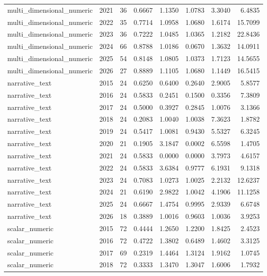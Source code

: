 \begin{tabular}{lrrrrrrr}
multi_dimensional_numeric & 2021 & 36 & 0.6667 & 1.1350 & 1.0783 & 3.3040 & 6.4835 \\
multi_dimensional_numeric & 2022 & 35 & 0.7714 & 1.0958 & 1.0680 & 1.6174 & 15.7099 \\
multi_dimensional_numeric & 2023 & 36 & 0.7222 & 1.0485 & 1.0365 & 1.2182 & 22.8436 \\
multi_dimensional_numeric & 2024 & 66 & 0.8788 & 1.0186 & 0.0670 & 1.3632 & 14.0911 \\
multi_dimensional_numeric & 2025 & 54 & 0.8148 & 1.0805 & 1.0373 & 1.7123 & 14.5655 \\
multi_dimensional_numeric & 2026 & 27 & 0.8889 & 1.1105 & 1.0680 & 1.1449 & 16.5415 \\
narrative_text & 2015 & 24 & 0.6250 & 0.6400 & 0.2640 & 2.9005 & 5.8577 \\
narrative_text & 2016 & 24 & 0.5833 & 0.2451 & 0.1500 & 0.3356 & 7.3809 \\
narrative_text & 2017 & 24 & 0.5000 & 0.3927 & 0.2845 & 1.0076 & 3.1366 \\
narrative_text & 2018 & 24 & 0.2083 & 1.0040 & 1.0038 & 7.3623 & 1.8782 \\
narrative_text & 2019 & 24 & 0.5417 & 1.0081 & 0.9430 & 5.5327 & 6.3245 \\
narrative_text & 2020 & 21 & 0.1905 & 3.1847 & 0.0002 & 6.5598 & 1.4705 \\
narrative_text & 2021 & 24 & 0.5833 & 0.0000 & 0.0000 & 3.7973 & 4.6157 \\
narrative_text & 2022 & 24 & 0.5833 & 3.6384 & 0.9777 & 6.1931 & 9.1318 \\
narrative_text & 2023 & 24 & 0.7083 & 1.0273 & 1.0025 & 2.2132 & 12.6237 \\
narrative_text & 2024 & 21 & 0.6190 & 2.9822 & 1.0042 & 4.1906 & 11.1258 \\
narrative_text & 2025 & 24 & 0.6667 & 1.4754 & 0.9995 & 2.9339 & 6.6748 \\
narrative_text & 2026 & 18 & 0.3889 & 1.0016 & 0.9603 & 1.0036 & 3.9253 \\
scalar_numeric & 2015 & 72 & 0.4444 & 1.2650 & 1.2200 & 1.8425 & 2.4523 \\
scalar_numeric & 2016 & 72 & 0.4722 & 1.3802 & 0.6489 & 1.4602 & 3.3125 \\
scalar_numeric & 2017 & 69 & 0.2319 & 1.4464 & 1.3124 & 1.9162 & 1.0745 \\
scalar_numeric & 2018 & 72 & 0.3333 & 1.3470 & 1.3047 & 1.6006 & 1.7932 \\

\end{tabular}
